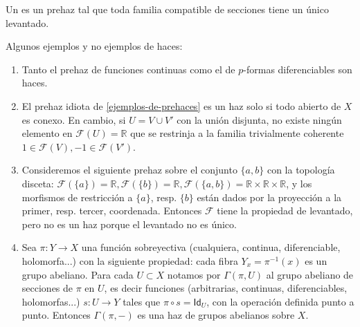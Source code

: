 \documentclass[11pt,fleqn]{article}
\newcommand\RR{\mathbb R}
\renewcommand\to{\longrightarrow}
\newcommand\id{\mathsf{Id}}
\newcommand\F{\mathcal F}
\newcommand\GG{\Gamma}
\begin{document}
\begin{Definition*}
Un  es un prehaz tal que toda familia compatible de secciones tiene un único
levantado.
\end{Definition*}

\begin{Example}
\label{ejemplos-de-haces}
Algunos ejemplos y no ejemplos de haces:
\begin{enumerate}
\item Tanto el prehaz de funciones continuas como el de $p$-formas diferenciables son haces. 

\item El prehaz idiota de \ref{ejemplos-de-prehaces} es un haz solo si todo abierto de $X$
	es conexo. En cambio, si $U = V \cup V'$ con la unión disjunta, no existe ningún
	elemento en $\F(U) = \RR$ que se restrinja a la familia trivialmente coherente $1 \in
	\F(V), -1 \in \F(V')$.

\item Consideremos el siguiente prehaz sobre el conjunto $\{a,b\}$ con la topología
	disceta: $\F(\{a\}) = \RR, \F(\{b\}) = \RR, \F(\{a,b\}) = \RR \times \RR \times \RR$, y
	los morfismos de restricción a $\{a\}$, resp. $\{b\}$ están dados por la proyección a
	la primer, resp. tercer, coordenada. Entonces $\F$ tiene la propiedad de levantado,
	pero no es un haz porque el levantado no es único.

\item Sea $\pi: Y \to X$ una función sobreyectiva (cualquiera, continua, diferenciable,
	holomorfa...) con la siguiente propiedad: cada fibra $Y_x = \pi^{-1}(x)$ es un grupo
	abeliano. Para cada $U \subset X$ notamos por $\GG(\pi, U)$ al grupo abeliano de
	secciones de $\pi$ en $U$, es decir funciones (arbitrarias, continuas, diferenciables,
	holomorfas...) $s: U \to Y$ tales que $\pi \circ s = \id_U$, con la operación definida
	punto a punto. Entonces $\GG(\pi, -)$ es una haz de grupos abelianos sobre $X$.
\end{enumerate}
\end{Example}
\end{document}
